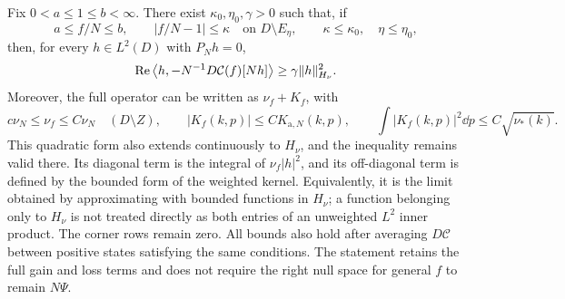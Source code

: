 \begin{proposition}\label{geom:localized}
Fix $0<a\le1\le b<\infty$. There exist $\kappa_0,\eta_0,\gamma>0$
such that, if
\[
 a\le f/N\le b,\qquad |f/N-1|\le\kappa\quad\text{on }D\setminus E_\eta,
 \qquad\kappa\le\kappa_0,\quad\eta\le\eta_0,
\]
then, for every $h\in L^2(D)$ with $P_Nh=0$,
\begin{equation}\label{geom:localizedcoercivity}
 \operatorname{Re}\left\langle h,-N^{-1}D\mathcal C(f)[Nh]\right\rangle
       \ge\gamma\|h\|_{H_\nu}^2.
\end{equation}
Moreover, the full operator can be written as $\nu_f+K_f$, with
\[
 c\nu_N\le\nu_f\le C\nu_N\quad(D\setminus Z),\qquad
 |K_f(k,p)|\le C K_{\mathrm a,N}(k,p),\qquad
 \int|K_f(k,p)|^2\dd p\le C\sqrt{\nu_*(k)}.
\]
This quadratic form also extends continuously to $H_\nu$, and the
inequality remains valid there. Its diagonal term is the integral of
$\nu_f|h|^2$, and its off-diagonal term is defined by the bounded form
of the weighted kernel. Equivalently, it is the limit obtained by
approximating with bounded functions in $H_\nu$; a function belonging
only to $H_\nu$ is not treated directly as both entries of an unweighted
$L^2$ inner product.
The corner rows remain zero.
All bounds also hold after averaging $D\mathcal C$ between positive
states satisfying the same conditions. The statement retains the full
gain and loss terms and does not require the right null space for
general $f$ to remain $N\Psi$.
\end{proposition}
